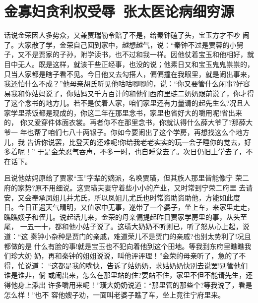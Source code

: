 \chapter{金寡妇贪利权受辱~张太医论病细穷源}

话说金荣因人多势众，又兼贾瑞勒令赔了不是，给秦钟磕了头，宝玉方才不吵
闹了。大家散了学，金荣自己回到家中，越想越气，说：“秦钟不过是贾蓉的小舅
子，又不是贾家的子孙，附学读书，也不过和我一样。因他仗着宝玉和他相好，就
目中无人。既是这样，就该干些正经事，也没的说；他素日又和宝玉鬼鬼祟祟的，
只当人家都是瞎子看不见。今日他又去勾搭人，偏偏撞在我眼里，就是闹出事来，
我还怕什么不成？”他母亲胡氏听见他咕咕唧唧的，说：“你又要管什么闲事?好容
易我和你姑妈说了，你姑妈又千方百计的和他们西府里琏二奶奶跟前说了，你才得
了这个念书的地方儿。若不是仗着人家，咱们家里还有力量请的起先生么?况且人
家学里茶饭都是现成的，你这二年在那里念书，家里也省好大的嚼用呢!省出来的，
你又爱穿件体面衣裳。再者你不在那里念书，你就认得什么薛大爷了?那薛大爷一
年也帮了咱们七八十两银子。你如今要闹出了这个学房，再想找这么个地方儿，我
告诉你说罢，比登天的还难呢!你给我老老实实的玩一会子睡你的觉去，好多着呢！”
于是金荣忍气吞声，不多一时，也自睡觉去了。次日仍旧上学去了，不在话下。

且说他姑妈原给了贾家“玉”字辈的嫡派，名唤贾璜，但其族人那里皆能像宁
荣二府的家势?原不用细说。这贾璜夫妻守着些小小的产业，又时常到宁荣二府里
去请安，又会奉承凤姐儿并尤氏，所以凤姐儿尤氏也时常资助资助他，方能如此度
日。今日正遇天气晴明，又值家中无事，遂带了一个婆子，坐上车，来家里走走，
瞧瞧嫂子和侄儿。说起话儿来，金荣的母亲偏提起昨日贾家学房里的事，从头至尾，
一五一十，都和他小姑子说了。这璜大奶奶不听则已，听了怒从心上起，说道：“这
秦钟小杂种是贾门的亲戚，难道荣儿不是贾门的亲戚?也别太势利了!况且都做的是
什么有脸的事!就是宝玉也不犯向着他到这个田地。等我到东府里瞧瞧我们珍大奶
奶，再和秦钟的姐姐说说，叫他评评理！”金荣的母亲听了，急的了不得，忙说道：
“这都是我的嘴快，告诉了姑奶奶，求姑奶奶快别去说罢!别管他们谁是谁非，倘
或闹出来，怎么在那里站的住?要站不住，家里不但不能请先生，还得他身上添出
许多嚼用来呢！”璜大奶奶说道：“那里管的那些个?等我说了，看是怎么样！”也不
容他嫂子劝，一面叫老婆子瞧了车，坐上竟往宁府里来。

